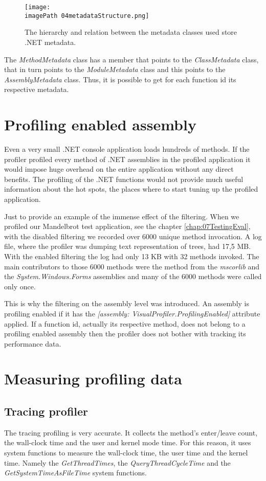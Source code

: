 \begin{figure}
	\centering
		\texttt{[image: \\imagePath 04metadataStructure.png]}
		\caption{The hierarchy and relation between the metadata classes used store .NET metadata.}
	\label{fig:04metadataStructure}
\end{figure}

The \textit{MethodMetadata} class has a member that points to the \textit{ClassMetadata} class, that in turn points to the \textit{ModuleMetadata} class and this points to the \textit{AssemblyMetadata} class. Thus, it is possible to get for each function id its respective metadata.

\section{Profiling enabled assembly}
\label{subsubsec:04ProfEnabAssem}
Even a very small .NET console application loads hundreds of methods. If the profiler profiled every method of .NET assemblies in the profiled application it would impose huge overhead on the entire application without any direct benefits. The profiling of the .NET functions would not provide much useful information about the hot spots, the places where to start tuning up the profiled application. 

Just to provide an example of the immense effect of the filtering. When we profiled our Mandelbrot test application, see the chapter \ref{chap:07TestingEval}, with the disabled filtering we recorded over 6000 unique method invocation. A log file, where the profiler was dumping text representation of trees, had 17,5 MB. With the enabled filtering the log had only 13 KB with 32 methods invoked. The main contributors to those 6000 methods were the method from the \textit{mscorlib} and the \textit{System.Windows.Forms} assemblies and many of the 6000 methods were called only once.

This is why the filtering on the assembly level was introduced. An assembly is profiling enabled if it has the \textit{[assembly: VisualProfiler.ProfilingEnabled]} attribute applied. If a function id, actually its respective method, does not belong to a profiling enabled assembly then the profiler does not bother with tracking its performance data.

\section{Measuring profiling data}
\subsection{Tracing profiler}
The tracing profiling is very accurate. It collects the method's enter/leave count, the wall-clock time and the user and kernel mode time. For this reason, it uses system functions to measure the wall-clock time, the user time and the kernel time. Namely the \textit{GetThreadTimes}, the \textit{QueryThreadCycleTime} and the \textit{GetSystemTimeAsFileTime} system functions.

